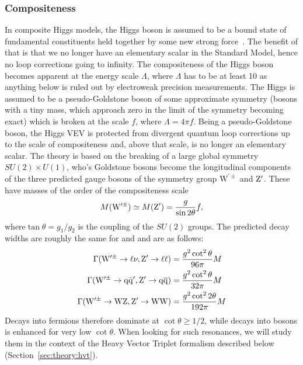 \subsubsection{Compositeness}
In composite Higgs models, the Higgs boson is assumed to be a bound state of fundamental constituents held together by some new strong force~\cite{Bellazzini:2014yua,Contino:2011np}. The benefit of that is that we no longer have an elementary scalar in the Standard Model, hence no loop corrections going to infinity. The compositeness of the Higgs boson becomes apparent at the energy scale $\Lambda$, where $\Lambda$ has to be at least 10 \TeV as anything below is ruled out by electroweak precision measurements.
The Higgs is assumed to be a pseudo-Goldstone boson of some approximate symmetry (bosons with a tiny mass, which approach zero in the limit of the symmetry becoming exact) which is broken at the scale $f$, where $\Lambda=4\pi f$. Being a pseudo-Goldstone boson, the Higgs VEV is protected from divergent quantum loop corrections up to the scale of compositeness and, above that scale, is no longer an elementary scalar.
The theory is based on the breaking of a large global symmetry $SU(2) \times U(1)$, who's Goldstone bosons become the longitudinal components of the three predicted gauge bosons of the symmetry group $\mathrm{W}^{\prime\pm}$  and $\mathrm{Z}^\prime$. These have masses of the order of the compositeness scale
\begin{equation}\label{eqn:LHvprimeMass}
M(\mathrm{W}^{\prime\pm}) \simeq M(\mathrm{Z}^\prime) = \frac{g}{\sin2\theta}f,
\end{equation}
\noindent where$\tan\theta = g_1/g_2$ is the coupling of the $SU(2)$ groups. The predicted decay widths are roughly the same for \PZpr and \PWpr and are as follows:
\begin{equation}
\begin{aligned}
\Gamma(\mathrm{W}^{\prime\pm} \to \ell\nu, \mathrm{Z}^\prime \to \ell\ell) & = \frac{g^2\cot^2\theta}{96\pi}M\\
\Gamma(\mathrm{W}^{\prime\pm} \to \mathrm{q}\bar{\mathrm{q}}^\prime,\mathrm{Z}^\prime \to \mathrm{q}\overline{\mathrm{q}}) & = \frac{g^2\cot^2\theta}{32\pi}M\\
\Gamma(\mathrm{W}^{\prime\pm} \to \mathrm{W}\mathrm{Z},\mathrm{Z}^\prime \to \mathrm{W}\mathrm{W}) & = \frac{g^2\cot^22\theta}{192\pi}M
\end{aligned} 
\end{equation}
Decays into fermions therefore dominate at $\cot\theta \geq 1/2$, while decays into bosons is enhanced for very low $\cot\theta$.\newline
When looking for such resonances, we will study them in the context of the Heavy Vector Triplet formalism described below (Section~\ref{sec:theory:hvt}).

